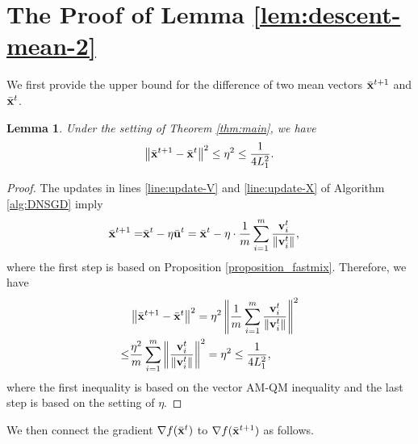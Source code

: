 \documentclass[sigconf]{acmart}
\newcommand{\Norm}[1]{\left\| #1 \right\|}
\def\vu{{\bf{u}}}
\def\vv{{\bf{v}}}
\def\vx{{\bf{x}}}
\theoremstyle{plain}
\newtheorem{lem}{Lemma}
\def\bx{{\bar\vx}}
\def\bu{{\bar\vu}}
\begin{document}
\section{The Proof of Lemma \ref{lem:descent-mean-2}}\label{sec:desent-proof}

We first provide the upper bound for the difference of two mean vectors $\bx^{t+1}$ and $\bx^t$.
\begin{lem}\label{lem:diff-bar-x}
Under the setting of Theorem \ref{thm:main}, we have
\begin{align*}
\Norm{\bx^{t+1} - \bx^t}^2 \leq  \eta^2 \leq \frac{1}{4L_1^2}. 
\end{align*}
\end{lem}
\begin{proof}
The updates in lines \ref{line:update-V} and \ref{line:update-X} of Algorithm \ref{alg:DNSGD} imply
\begin{align}\label{eq:diff-bar-x}
    \bx^{t+1} =& \bx^t - \eta \bu^t 
    =  \bx^t - \eta \cdot \frac{1}{m}\sum_{i=1}^m \frac{\vv^t_i}{\Norm{\vv^t_i}},
\end{align}
where the first step is based on Proposition \ref{proposition_fastmix}. Therefore, we have
\begin{align}\label{eq:bx-eta}
\begin{split}    
   & \Norm{\bx^{t+1} - \bx^t}^2 
=  \eta^2\Norm{\frac{1}{m}\sum_{i=1}^m \frac{\vv^t_i}{\Norm{\vv^t_i}}}^2  \\
\leq & \frac{\eta^2}{m}\sum_{i=1}^m\Norm{ \frac{\vv^t_i}{\Norm{\vv^t_i}}}^2
=  \eta^2 \leq \frac{1}{4L_1^2},
\end{split}
\end{align}    
where the first inequality is based on the vector AM-QM inequality and the last step is based on the setting of $\eta$.
\end{proof}

We then connect the gradient $\nabla f(\bx^{t})$ to $\nabla f(\bx^{t+1})$ as follows.
\end{document}
